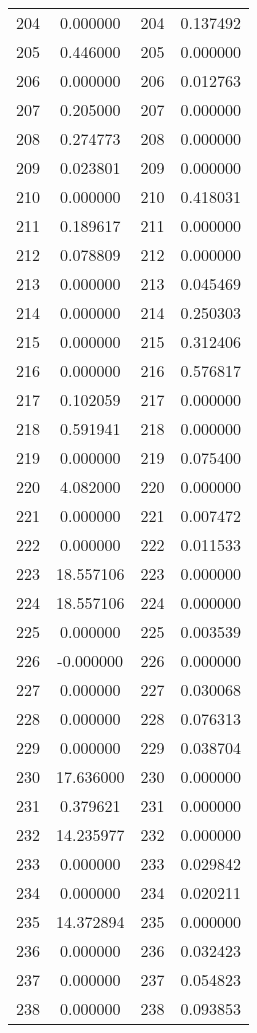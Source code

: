\documentclass[12pt]{article}
\begin{document}
\begin{longtable}{@{}cccc@{}}
204 & 0.000000 & 204 & 0.137492 \\
205 & 0.446000 & 205 & 0.000000 \\
206 & 0.000000 & 206 & 0.012763 \\
207 & 0.205000 & 207 & 0.000000 \\
208 & 0.274773 & 208 & 0.000000 \\
209 & 0.023801 & 209 & 0.000000 \\
210 & 0.000000 & 210 & 0.418031 \\
211 & 0.189617 & 211 & 0.000000 \\
212 & 0.078809 & 212 & 0.000000 \\
213 & 0.000000 & 213 & 0.045469 \\
214 & 0.000000 & 214 & 0.250303 \\
215 & 0.000000 & 215 & 0.312406 \\
216 & 0.000000 & 216 & 0.576817 \\
217 & 0.102059 & 217 & 0.000000 \\
218 & 0.591941 & 218 & 0.000000 \\
219 & 0.000000 & 219 & 0.075400 \\
220 & 4.082000 & 220 & 0.000000 \\
221 & 0.000000 & 221 & 0.007472 \\
222 & 0.000000 & 222 & 0.011533 \\
223 & 18.557106 & 223 & 0.000000 \\
224 & 18.557106 & 224 & 0.000000 \\
225 & 0.000000 & 225 & 0.003539 \\
226 & -0.000000 & 226 & 0.000000 \\
227 & 0.000000 & 227 & 0.030068 \\
228 & 0.000000 & 228 & 0.076313 \\
229 & 0.000000 & 229 & 0.038704 \\
230 & 17.636000 & 230 & 0.000000 \\
231 & 0.379621 & 231 & 0.000000 \\
232 & 14.235977 & 232 & 0.000000 \\
233 & 0.000000 & 233 & 0.029842 \\
234 & 0.000000 & 234 & 0.020211 \\
235 & 14.372894 & 235 & 0.000000 \\
236 & 0.000000 & 236 & 0.032423 \\
237 & 0.000000 & 237 & 0.054823 \\
238 & 0.000000 & 238 & 0.093853 \\

\end{longtable}
\end{document}
